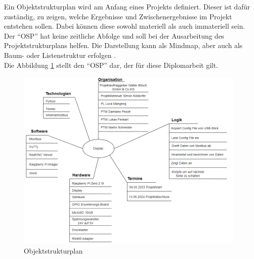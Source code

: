 Ein Objektstrukturplan wird am Anfang eines Projekts definiert. Dieser ist dafür zuständig, zu zeigen, welche Ergebnisse und Zwischenergebnisse im Projekt entstehen sollen. Dabei können diese sowohl materiell als auch immateriell sein. Der \enquote{OSP} hat keine zeitliche Abfolge und soll bei der Ausarbeitung des Projektstrukturplans helfen. Die Darstellung kann als Mindmap, aber auch als Baum- oder Listenstruktur erfolgen \cite[vgl.][]{fsgu-akademie:2022}. \\
Die Abbildung \ref{fig:objektstrukturplan} stellt den \enquote{OSP} dar, der für diese Diplomarbeit gilt.

\begin{figure}[H]
	\centering
	\includegraphics[width=1\linewidth]{Bilder/objektstrukturenplan}
	\caption{Objektstrukturplan}
	\label{fig:objektstrukturplan}
\end{figure}